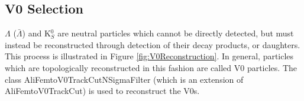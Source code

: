 \documentclass[../AnalysisNoteJBuxton.tex]{subfiles}
\begin{document}
\subsection{V0 Selection}
\label{V0Selection}

$\Lambda$ ($\bar{\Lambda}$) and K$^{0}_{S}$ are neutral particles which cannot be directly detected, but must instead be reconstructed through detection of their decay products, or daughters.  
This process is illustrated in Figure \ref{fig:V0Reconstruction}.
In general, particles which are topologically reconstructed in this fashion are called V0 particles.
The class AliFemtoV0TrackCutNSigmaFilter (which is an extension of AliFemtoV0TrackCut) is used to reconstruct the V0s.

\end{document}
